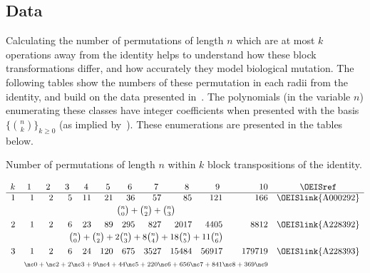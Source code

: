 \documentclass[12pt,twoside]{memoir}
\begin{document}
    \subsection{Data}
    
      Calculating the number of permutations of length $n$ which are at most $k$ operations
      away from the identity helps to understand how these block transformations
      differ, and how accurately they model biological mutation. The following
      tables show the numbers of these permutation in each radii from the
      identity, and build on the data presented in~\cite{GenomeBook}. The
      polynomials (in the variable $n$) enumerating these classes have integer
      coefficients when presented with the basis $\{\binom{n}{k}\}_{k \geq 0}$
      (as implied by~\cite{Klazar2003}). These enumerations are presented in the
      tables below. 
    

      \begin{table}[t]
      \caption{Number of permutations of length $n$ within $k$ block transpositions of the
                identity.}
      \begin{footnotesize}
      $$
      \begin{array}{rrrrrrrrrrrc} 
      k &\ 1\ &\ 2\ &\ 3\ &\ 4\ &\ 5\ &\
      6\ &\ 7\ &\ 8\ &\ 9\ &10&\text{\OEISref}\\\hline
      1&1&2&5&11&21&36&57&85&121&166&\text{\OEISlink{A000292}}\\[0.5ex]
      &\multicolumn{10}{c}{{n\choose 0}+{n\choose 2}+{n\choose 3}}&\\[1ex]
      2&1&2&6&23&89&295&827&2017&4405&8812&\text{\OEISlink{A228392}}\\[0.5ex]
      &\multicolumn{10}{c}{{n\choose 0}+{n\choose 2}+2{n\choose 3}+8{n\choose
      4}+18{n\choose 5}+11{n\choose 6}}&\\[1ex]
      3&1&2&6&24&120&675&3527&15484&56917&179719&\text{\OEISlink{A228393}}\\[0.5ex]
      &\multicolumn{10}{c}{\text{\scriptsize $\nc0 + \nc2 + 2\nc3 + 9\nc4 +
      44\nc5 + 220\nc6 + 656\nc7 + 841\nc8 + 369\nc9$} }&\\[1ex]
      \end{array}
      $$
      \end{footnotesize}
      \end{table}
\end{document}
